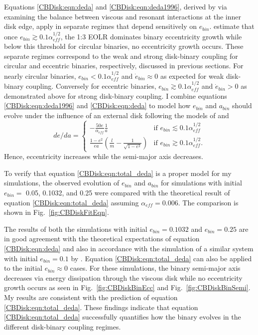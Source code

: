 Equations \ref{CBDisk:eqn:deda} and \ref{CBDisk:eqn:deda1996}, derived by \citet{Artymowicz1996b} via examining the balance between viscous and resonant interactions at the inner 
disk edge, apply in separate regimes that depend sensitively on $e_{bin}$.  \citet{Artymowicz1996b} estimate that once $e_{bin} \gtrsim 0.1 \alpha_{eff}^{1/2}$, the 1:3 
EOLR dominates binary eccentricity growth while below this threshold for circular binaries, no eccentricity growth occurs.  These separate regimes correspond 
to the weak and strong disk-binary coupling for circular and eccentric binaries, respectively, discussed in previous sections.  For nearly circular binaries, 
$e_{bin} < 0.1 \alpha_{eff}^{1/2}$ and $\dot{e}_{bin} \approx 0$ as expected for weak disk-binary coupling.  Conversely for eccentric binaries, $e_{bin} \gtrsim 
0.1 \alpha_{eff}^{1/2}$ and $\dot{e}_{bin} > 0$ as demonstrated above for strong disk-binary coupling.  I combine equations \ref{CBDisk:eqn:deda1996} and 
\ref{CBDisk:eqn:deda} to model how $e_{bin}$ and $a_{bin}$ should evolve under the influence of an external disk following the models of \citet{Artymowicz1996b,Artymowicz2000} and 
\citet{Dermine2013}
\begin{equation}
\label{CBDisk:eqn:total_deda}
de/da=
\begin{cases}
-\frac{50e}{\alpha_{eff}}\frac{1}{a} & \text{if } e_{bin} \lesssim 0.1 \alpha_{eff}^{1/2}\\
\frac{1 - e^2}{ea} \left(\frac{l}{m} - \frac{1}{\sqrt{1 - e^2}}\right) & \text{if } e_{bin} \gtrsim 0.1 \alpha_{eff}^{1/2}.
\end{cases}
\end{equation}
Hence, eccentricity increases while the semi-major axis decreases.

To verify that equation \ref{CBDisk:eqn:total_deda} is a proper model for my simulations, the observed evolution of $e_{bin}$ and $a_{bin}$ for simulations with initial $e_{bin} =$ 0.05, 0.1032, and 0.25 were compared with the theoretical result of equation \ref{CBDisk:eqn:total_deda} assuming $\alpha_{eff} = 0.006$.  The comparison is shown in Fig.~\ref{fig:CBDiskFitEqn}.

The results of both the simulations with initial $e_{bin} = 0.1032$ and $e_{bin} = 0.25$ are in good agreement with the theoretical expectations of equation \ref{CBDisk:eqn:deda} and also in accordance with the simulation of a similar system with initial $e_{bin} = 0.1$ by \citet{Artymowicz1991}.  Equation \ref{CBDisk:eqn:total_deda} can also be applied to the initial $e_{bin} \approx 0$ cases.  For these simulations, the binary semi-major axis decreases via energy dissipation through the viscous disk while no eccentricity growth occurs as seen in Fig.~\ref{fig:CBDiskBinEcc} and Fig.~\ref{fig:CBDiskBinSemi}.  My results are consistent with the prediction of equation \ref{CBDisk:eqn:total_deda}.  These findings indicate that equation \ref{CBDisk:eqn:total_deda} successfully quantifies how the binary evolves in the different disk-binary coupling regimes.

